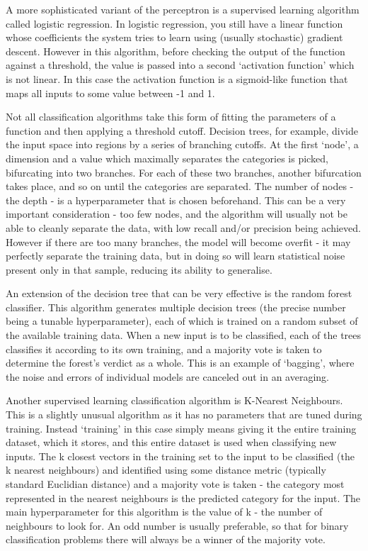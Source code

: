 A more sophisticated variant of the perceptron is a supervised learning algorithm called logistic regression. In logistic regression, you still have a linear function whose coefficients the system tries to learn using (usually stochastic) gradient descent. However in this algorithm, before checking the output of the function against a threshold, the value is passed into a second `activation function' which is not linear. In this case the activation function is a sigmoid-like function that maps all inputs to some value between -1 and 1.

Not all classification algorithms take this form of fitting the parameters of a function and then applying a threshold cutoff. Decision trees, for example, divide the input space into regions by a series of branching cutoffs. At the first `node', a dimension and a value which maximally separates the categories is picked, bifurcating into two branches. For each of these two branches, another bifurcation takes place, and so on until the categories are separated. The number of nodes - the depth - is a hyperparameter that is chosen beforehand. This can be a very important consideration - too few nodes, and the algorithm will usually not be able to cleanly separate the data, with low recall and/or precision being achieved. However if there are too many branches, the model will become overfit - it may perfectly separate the training data, but in doing so will learn statistical noise present only in that sample, reducing its ability to generalise.

An extension of the decision tree that can be very effective is the random forest classifier. This algorithm generates multiple decision trees (the precise number being a tunable hyperparameter), each of which is trained on a random subset of the available training data. When a new input is to be classified, each of the trees classifies it according to its own training, and a majority vote is taken to determine the forest's verdict as a whole. This is an example of `bagging', where the noise and errors of individual models are canceled out in an averaging. 

Another supervised learning classification algorithm is K-Nearest Neighbours. This is a slightly unusual algorithm as it has no parameters that are tuned during training. Instead `training' in this case simply means giving it the entire training dataset, which it stores, and this entire dataset is used when classifying new inputs. The k closest vectors in the training set to the input to be classified (the k nearest neighbours) and identified using some distance metric (typically standard Euclidian distance) and a majority vote is taken - the category most represented in the nearest neighbours is the predicted category for the input. The main hyperparameter for this algorithm is the value of k - the number of neighbours to look for. An odd number is usually preferable, so that for binary classification problems there will always be a winner of the majority vote.

